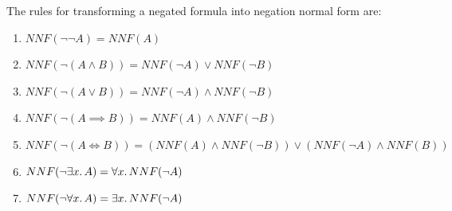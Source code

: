 \begin{node}
The rules for transforming a negated formula into negation normal form
are:
\begin{enumerate}
\item $NNF(\neg\neg A)=NNF(A)$
\item $NNF(\neg(A\land B))=NNF(\neg A)\lor NNF(\neg B)$
\item $NNF(\neg(A\lor B))=NNF(\neg A)\land NNF(\neg B)$
\item $NNF(\neg(A\implies B))=NNF(A)\land NNF(\neg B)$
\item $NNF(\neg(A\iff B))=(NNF(A)\land NNF(\neg B))\lor(NNF(\neg A)\land NNF(B))$
\item $NNF(\neg\exists x\ldotp A)=\forall x\ldotp NNF(\neg A)$
\item $NNF(\neg\forall x\ldotp A)=\exists x\ldotp NNF(\neg A)$
\end{enumerate}
\end{node}

